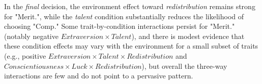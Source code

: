 \documentclass[11pt]{article}
\begin{document}
In the \emph{final} decision, the environment effect toward \emph{redistribution} remains strong for "Merit.", while the \emph{talent} condition substantially reduces the likelihood of choosing "Comp." Some trait-by-condition interactions persist for "Merit." (notably negative $Extraversion \times Talent$), and there is modest evidence that these condition effects may vary with the environment for a small subset of traits (e.g., positive $Extraversion \times Talent \times Redistribution$ and $Conscientiousness \times Luck \times Redistribution$), but overall the three-way interactions are few and do not point to a pervasive pattern. 



\begingroup
\renewcommand{\arraystretch}{0.9}


\pagebreak

\par \medskip

\let\JPEoriginaltable\table
\def\table[#1]{\JPEoriginaltable[H]}

\endgroup
\end{document}
